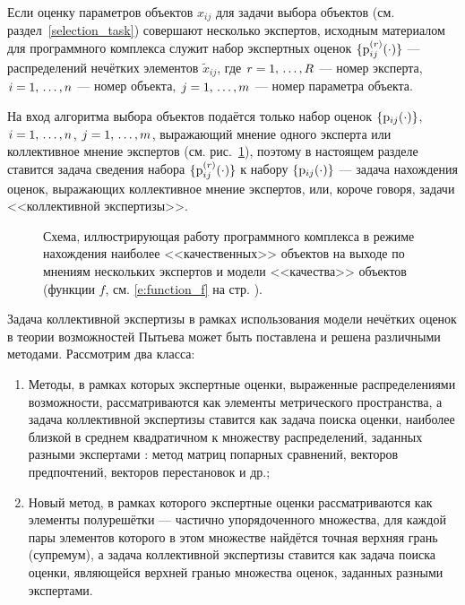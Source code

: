 \label{collective_global}


Если оценку параметров объектов $x_{ij}$ для задачи выбора объектов (см. раздел~\ref{selection_task}) совершают несколько экспертов, исходным материалом для программного комплекса служит набор экспертных оценок $\{{\mathrm{p}}^{(r)}_{ij}(\cdot)\}$ --- распределений нечётких элементов $\tilde x_{ij}$, где $r = 1,\, \ldots, R$ --- номер эксперта, $i = 1,\, \ldots, n$ --- номер объекта, $j = 1,\, \ldots, m$ --- номер параметра объекта.

На вход алгоритма выбора объектов подаётся только набор оценок $\{{\mathrm{p}}_{ij}(\cdot)\}$, $i = 1,\, \ldots, n$, $j = 1,\, \ldots, m$, выражающий мнение одного эксперта или коллективное мнение экспертов (см. рис.~\ref{ris:program_global}), поэтому в настоящем разделе ставится задача сведения набора $\{{\mathrm{p}}^{(r)}_{ij}(\cdot)\}$ к набору $\{{\mathrm{p}}_{ij}(\cdot)\}$ --- задача нахождения  оценок, выражающих коллективное мнение экспертов, или, короче говоря, задачи <<коллективной экспертизы>>. 

\begin{figure}[h]
\caption{\small Схема, иллюстрирующая работу программного комплекса в режиме нахождения наиболее <<качественных>> объектов на выходе по мнениям нескольких экспертов и модели <<качества>> объектов (функции $f$, см. \eqref{e:function_f} на стр. \pageref{e:function_f}).}
\label{ris:program_global}
\end{figure}

Задача коллективной экспертизы в рамках использования модели нечётких оценок в теории возможностей Пытьева может быть поставлена и решена различными методами. Рассмотрим два класса:
	\begin{enumerate}
		\item Методы, в рамках которых экспертные оценки, выраженные распределениями возможности, рассматриваются как элементы метрического пространства, а задача коллективной экспертизы ставится как задача поиска оценки, наиболее близкой в среднем квадратичном к множеству распределений, заданных разными экспертами  \cite{pytyev_experts}: метод матриц попарных сравнений, векторов предпочтений, векторов перестановок и др.;
		\item Новый метод, в рамках которого экспертные оценки рассматриваются как элементы полурешётки 
		--- частично упорядоченного множества, для каждой пары элементов которого в этом множестве найдётся точная верхняя  грань (супремум), %
		а задача коллективной экспертизы ставится как задача поиска оценки, являющейся верхней гранью множества оценок, заданных разными экспертами.
	\end{enumerate} 
	

